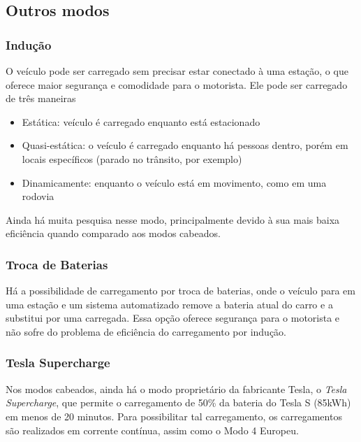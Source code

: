     \subsection{Outros modos}

      \subsubsection{Indução}

        O veículo pode ser carregado sem precisar estar conectado à uma estação, o que oferece maior segurança e comodidade para o motorista. Ele pode ser carregado de três maneiras

        \begin{itemize}
          \item Estática: veículo é carregado enquanto está estacionado
          \item Quasi-estática: o veículo é carregado enquanto há pessoas dentro, porém em locais específicos (parado no trânsito, por exemplo)
          \item Dinamicamente: enquanto o veículo está em movimento, como em uma rodovia
        \end{itemize}

        Ainda há muita pesquisa nesse modo, principalmente devido à sua mais baixa eficiência quando comparado aos modos cabeados.

      \subsubsection{Troca de Baterias}

        Há a possibilidade de carregamento por troca de baterias, onde o veículo para em uma estação e um sistema automatizado remove a bateria atual do carro e a substitui por uma carregada. Essa opção oferece segurança para o motorista e não sofre do problema de eficiência do carregamento por indução.

      \subsubsection{Tesla Supercharge}

        Nos modos cabeados, ainda há o modo proprietário da fabricante Tesla, o \textit{Tesla Supercharge}, que permite o carregamento de 50\% da bateria do Tesla S (85kWh) em menos de 20 minutos. Para possibilitar tal carregamento, os carregamentos são realizados em corrente contínua, assim como o Modo 4 Europeu.

